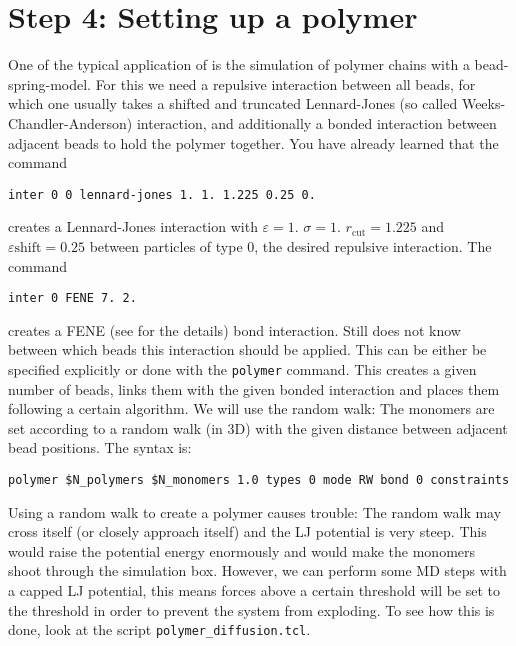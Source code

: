 \section{Step 4: Setting up a polymer}
One of the typical application of \ES{} is the simulation of polymer chains 
with a bead-spring-model. For this we need a repulsive interaction
between all beads, for which one usually takes a shifted and truncated
Lennard-Jones (so called Weeks-Chandler-Anderson) interaction, 
and additionally a bonded interaction between 
adjacent beads to hold the polymer together. You have already learned
that the command
{\vspace{0,2cm}\small
\begin{lstlisting}[numbers=none]
inter 0 0 lennard-jones 1. 1. 1.225 0.25 0. 
\end{lstlisting}\vspace{0,2cm}
}
creates a Lennard-Jones interaction with $\varepsilon=1.$ $\sigma=1.$
$r_\text{cut} = 1.225$ and $\varepsilon\text{shift}=0.25$ between particles
of type 0, the desired 
repulsive interaction. The command
{\vspace{0,2cm}\small
\begin{lstlisting}[numbers=none]
inter 0 FENE 7. 2. 
\end{lstlisting}\vspace{0,2cm}
}
creates a FENE (see \ES{} for the details) bond interaction. Still \ES{}
does not know between which beads this interaction should be applied.
This can be either be specified explicitly or done with the \lstinline|polymer|
command. This creates a given number of beads, links them with the given
bonded interaction and places them following a certain algorithm. We will
use the random walk: The monomers are set according to a random walk (in 3D)
with the given distance between adjacent bead positions. The syntax is:
{\vspace{0,2cm}\small
\begin{lstlisting}[numbers=none]
  polymer $N_polymers $N_monomers 1.0 types 0 mode RW bond 0 constraints 
\end{lstlisting}\vspace{0,2cm}
}
Using a random walk to create a polymer causes trouble: The random walk may 
cross itself (or closely approach itself) and the LJ potential is very
steep. This would raise the potential energy enormously and would make
the monomers shoot through the simulation box. 
However, we can perform some MD steps with a capped LJ potential, this means 
forces above a certain threshold will be set to the threshold in order to prevent
the system from exploding. To see how this is done, look at the script 
\lstinline|polymer_diffusion.tcl|.

